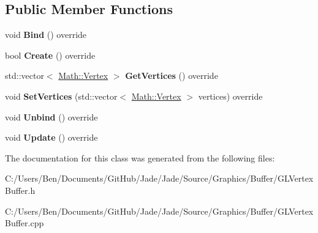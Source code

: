 \subsection*{Public Member Functions}
\begin{DoxyCompactItemize}
\item 
\hypertarget{class_jade_1_1_graphics_1_1_g_l_vertex_buffer_af79d4779d5d4822bb0de36f03878b457}{}void {\bfseries Bind} () override\label{class_jade_1_1_graphics_1_1_g_l_vertex_buffer_af79d4779d5d4822bb0de36f03878b457}

\item 
\hypertarget{class_jade_1_1_graphics_1_1_g_l_vertex_buffer_acca109fdff3d6206217301eca1c1b9f2}{}bool {\bfseries Create} () override\label{class_jade_1_1_graphics_1_1_g_l_vertex_buffer_acca109fdff3d6206217301eca1c1b9f2}

\item 
\hypertarget{class_jade_1_1_graphics_1_1_g_l_vertex_buffer_a6d716c8443a36212e067b9b00b5206c8}{}std\+::vector$<$ \hyperlink{struct_jade_1_1_math_1_1_vertex}{Math\+::\+Vertex} $>$ {\bfseries Get\+Vertices} () override\label{class_jade_1_1_graphics_1_1_g_l_vertex_buffer_a6d716c8443a36212e067b9b00b5206c8}

\item 
\hypertarget{class_jade_1_1_graphics_1_1_g_l_vertex_buffer_a7b72fb56d2d741ebfdfe65e6a1df2963}{}void {\bfseries Set\+Vertices} (std\+::vector$<$ \hyperlink{struct_jade_1_1_math_1_1_vertex}{Math\+::\+Vertex} $>$ vertices) override\label{class_jade_1_1_graphics_1_1_g_l_vertex_buffer_a7b72fb56d2d741ebfdfe65e6a1df2963}

\item 
\hypertarget{class_jade_1_1_graphics_1_1_g_l_vertex_buffer_ae2b294bf5e590262e32a33e6223bf581}{}void {\bfseries Unbind} () override\label{class_jade_1_1_graphics_1_1_g_l_vertex_buffer_ae2b294bf5e590262e32a33e6223bf581}

\item 
\hypertarget{class_jade_1_1_graphics_1_1_g_l_vertex_buffer_ae2d6ee6503cd4a060ea8e03d2ecd3f00}{}void {\bfseries Update} () override\label{class_jade_1_1_graphics_1_1_g_l_vertex_buffer_ae2d6ee6503cd4a060ea8e03d2ecd3f00}

\end{DoxyCompactItemize}


The documentation for this class was generated from the following files\+:\begin{DoxyCompactItemize}
\item 
C\+:/\+Users/\+Ben/\+Documents/\+Git\+Hub/\+Jade/\+Jade/\+Source/\+Graphics/\+Buffer/G\+L\+Vertex\+Buffer.\+h\item 
C\+:/\+Users/\+Ben/\+Documents/\+Git\+Hub/\+Jade/\+Jade/\+Source/\+Graphics/\+Buffer/G\+L\+Vertex\+Buffer.\+cpp\end{DoxyCompactItemize}
